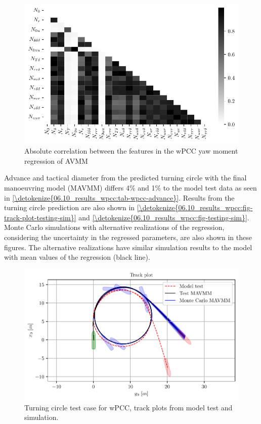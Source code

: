\begin{figure}[!htb]
\centering
\includegraphics[width=\textwidth]{kappa/images/9.pdf}
\caption{Absolute correlation between the features in the wPCC yaw moment regression of AVMM}\label{\detokenize{06.10_results_wpcc:fig-ncorr}}\end{figure}
\noindent Advance and tactical diameter \cite{imo_standards_2002} from the predicted turning circle with the final manoeuvring model (MAVMM) differs 4\% and 1\% to the model test data as seen in \autoref{\detokenize{06.10_results_wpcc:tab-wpcc-advance}}. Results from the turning circle prediction are also shown in  \autoref{\detokenize{06.10_results_wpcc:fig-track-plot-testing-sim}} and  \autoref{\detokenize{06.10_results_wpcc:fig-testing-sim}}. Monte Carlo simulations with alternative realizations of the regression, considering the uncertainty in the regressed parameters, are also shown in these figures. The alternative realizations have similar simulation results to the model with mean values of the regression (black line).

\begin{figure}[!htb]
\centering
\includegraphics[width=\textwidth]{kappa/images/10.pdf}
\caption{Turning circle test case for wPCC, track plots from model test and simulation.}\label{\detokenize{06.10_results_wpcc:fig-track-plot-testing-sim}}\end{figure}

